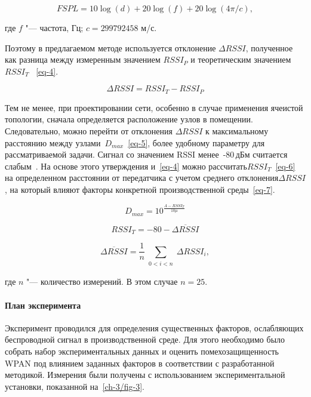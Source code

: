 \begin{equation}
	FSPL = 10 \log (d) +20 \log (f) +20 \log (4 \pi/c),
	\label{eq-3}
\end{equation}

\noindent где $f$ "--- частота, Гц; $c = 299792458$ м/с.

Поэтому в предлагаемом методе используется отклонение $\Delta RSSI$, полученное как разница между измеренным значением $RSSI_P$ и теоретическим значением $RSSI_T$~ \cref{eq-4}.

\begin{equation}
	\Delta RSSI = RSSI_T-RSSI_P
	\label{eq-4}
\end{equation}

Тем не менее, при проектировании сети, особенно в случае применения ячеистой топологии, сначала определяется расположение узлов в помещении. Следовательно, можно перейти от отклонения $\Delta RSSI$ к максимальному расстоянию между узлами~$D_{max}$~\cref{eq-5}, более удобному параметру для рассматриваемой задачи. Сигнал со значением RSSI менее~-80\,дБм считается слабым~\cite{mob_sig}. На основе этого утверждения и~\cref{eq-4} можно рассчитать$RSSI_T$~\cref{eq-6} на определенном расстоянии от передатчика с учетом среднего отклонения$\Delta RSSI$, на который влияют факторы конкретной производственной среды~\cref{eq-7}.

\begin{equation}
	D_{max} = 10^\frac{A-RSSI_T}{10 \mu}
	\label{eq-5}
\end{equation}

\begin{equation}
	RSSI_T = -80-\overline{{\mathit \Delta} RSSI}
	\label{eq-6}
\end{equation}

\begin{equation}
	\overline{{\mathit \Delta} RSSI} = \frac1n \sum_{\substack{0 < i < n}}{\mathit\Delta} RSSI_i,
	\label{eq-7}
\end{equation}

\noindent где $n$ "--- количество измерений. В этом случае $n = 25$.

\paragraph{План эксперимента}

Эксперимент проводился для определения существенных факторов, ослабляющих беспроводной сигнал в производственной среде. Для этого необходимо было собрать набор экспериментальных данных и оценить помехозащищенность WPAN под влиянием заданных факторов в соответствии с разработанной методикой.
Измерения были получены с использованием экспериментальной установки, показанной на~\cref{ch-3/fig-3}.

